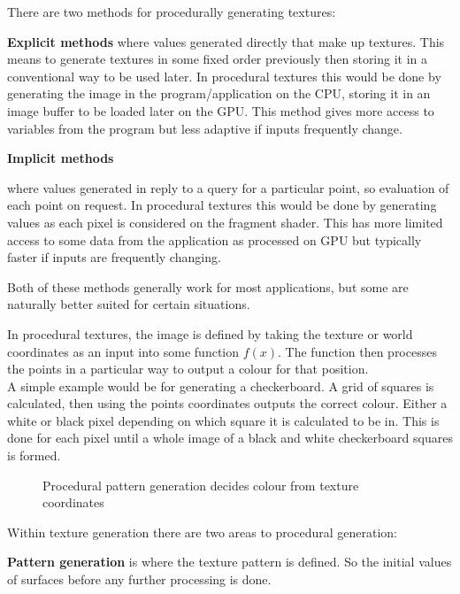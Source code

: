 \documentclass{report}
\begin{document}
There are two methods for procedurally generating textures:

\textbf{Explicit methods} where values generated directly that make up textures. This means to generate textures in some fixed order previously then storing it in a conventional way to be used later. In procedural textures this would be done by generating the image in the program/application on the CPU, storing it in an image buffer to be loaded later on the GPU. This method gives more access to variables from the program but less adaptive if inputs frequently change.

\hypertarget{txt:im}{\textbf{Implicit methods}} where values generated in reply to a query for a particular point, so evaluation of each point on request. In procedural textures this would be done by generating values as each pixel is considered on the fragment shader. This has more limited access to some data from the application as processed on GPU but typically faster if inputs are frequently changing.

Both of these methods generally work for most applications, but some are naturally better suited for certain situations.

In procedural textures, the image is defined by taking the texture or world coordinates as an input into some function $f(x)$. The function then processes the points 
in a particular way to output a colour for that position.\\
A simple example would be for generating a checkerboard. A grid of squares is calculated, then using the points coordinates outputs the correct colour. Either a white 
or black pixel depending on which square it is calculated to be in. This is done for each pixel until a whole image of a black and white checkerboard squares is formed.

\vspace{0.8cm}

\begin{figure}
\centerline{}
\caption[Procedural pattern generation]{}
\centerline{Procedural pattern generation decides colour from texture coordinates}
\end{figure}

\vspace{0.8cm}

Within texture generation there are two areas to procedural generation:

\textbf{Pattern generation} is where the texture pattern is defined. So the initial values of surfaces before any further processing is done.
\end{document}
